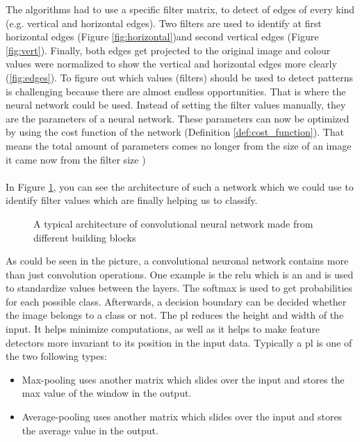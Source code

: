 The algorithms had to use a specific filter matrix, to detect of edges of every kind (e.g. vertical and horizontal edges). Two filters are used to identify at first horizontal edges (Figure \ref{fig:horizontal})and second vertical edges (Figure \ref{fig:vert}). Finally, both edges get projected to the original image and colour values were normalized to show the vertical and horizontal edges more clearly (\ref{fig:edges}). To figure out which values (filters) should be used to detect patterns is challenging because there are almost endless opportunities. That is where the neural network could be used. Instead of setting the filter values manually, they are the parameters of a neural network. These parameters can now be optimized by using the cost function of the network (Definition \ref{def:cost_function}). That means the total amount of parameters comes no longer from the size of an image it came now from the filter size \cite{AndrewNG})\\\\

In Figure \ref{fig:archi}, you can see the architecture of such a network which we could use to identify filter values which are finally helping us to classify.

\begin{figure}[htp]
	\centering
	\caption{A typical architecture of convolutional neural network made from different building blocks}
	\label{fig:archi}
\end{figure}

As could be seen in the picture, a convolutional neuronal network contains more than just convolution operations. One example is the \Gls{relu} which is an  and is used to standardize values between the layers. The softmax  is used to get probabilities for each possible class. Afterwards, a decision boundary can be decided whether the image belongs to a class or not. The \Gls{pl} reduces the height and width of the input. It helps minimize computations, as well as it helps to make feature detectors more invariant to its position in the input data. Typically a \Gls{pl} is one of the two following types:

\begin{itemize}
	\item Max-pooling uses another matrix which slides over the input and stores the max value of the window in the output.
	\item Average-pooling uses another matrix which slides over the input and stores the average value in the output.
\end{itemize}

